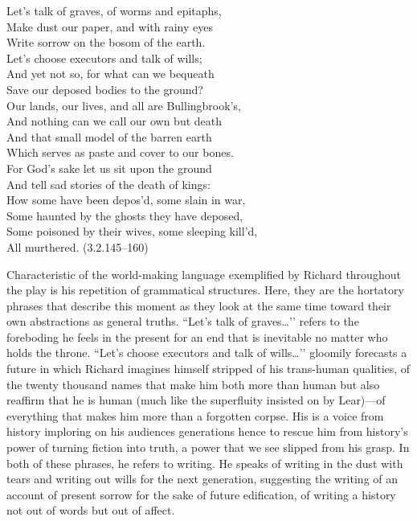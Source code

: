 \begin{vq}
Let’s talk of graves, of worms and epitaphs, \\
Make dust our paper, and with rainy eyes \\
Write sorrow on the bosom of the earth. \\
Let’s choose executors and talk of wills; \\
And yet not so, for what can we bequeath \\
Save our deposed bodies to the ground? \\
Our lands, our lives, and all are Bullingbrook’s, \\
And nothing can we call our own but death \\
And that small model of the barren earth \\
Which serves as paste and cover to our bones. \\
For God’s sake let us sit upon the ground \\
And tell sad stories of the death of kings: \\
How some have been depos’d, some slain in war, \\
Some haunted by the ghosts they have deposed, \\
Some poisoned by their wives, some sleeping kill’d, \\
All murthered. (3.2.145--160)
\end{vq}
Characteristic of the world-making language exemplified by Richard throughout the play is his repetition of grammatical structures.
Here, they are the hortatory phrases that describe this moment as they look at the same time toward their own abstractions as general truths.
``Let’s talk of graves\dots’’ refers to the foreboding he feels in the present for an end that is inevitable no matter who holds the throne.
``Let’s choose executors and talk of wills\dots’’ gloomily forecasts a future in which Richard imagines himself stripped of his trans-human qualities, of the twenty thousand names that make him both more than human but also reaffirm that he is human (much like the superfluity insisted on by Lear)---of everything that makes him more than a forgotten corpse.
His is a voice from history imploring on his audiences generations hence to rescue him from history’s power of turning fiction into truth, a power that we see slipped from his grasp.
In both of these phrases, he refers to writing.
He speaks of writing in the dust with tears and writing out wills for the next generation, suggesting the writing of an account of present sorrow for the sake of future edification, of writing a history not out of words but out of affect.
